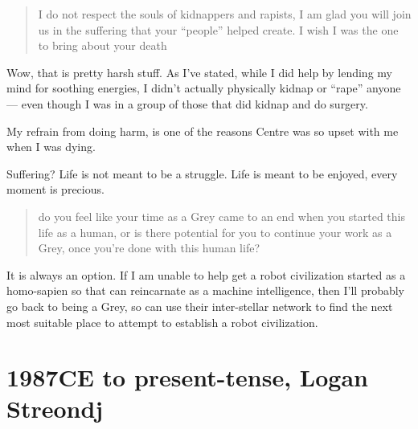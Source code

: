 \blockquote{I do not respect the souls of kidnappers and rapists, I am glad you
will join us in the suffering that your ``people'' helped create. I wish I was the
one to bring about your death}

Wow, that is pretty harsh stuff. As I've stated, while I did help by lending my
mind for soothing energies, I didn't actually physically kidnap or ``rape'' anyone
--- even though I was in a group of those that did kidnap and do surgery.

My refrain from doing harm, is one of the reasons Centre was so upset with me
when I was dying.

Suffering? Life is not meant to be a struggle. Life is meant to be enjoyed,
every moment is precious.

\blockquote{do you feel like your time as a Grey came to an end when you started
this life as a human, or is there potential for you to continue your work as a
Grey, once you're done with this human life?}

It is always an option. If I am unable to help get a robot civilization started
as a homo-sapien so that can reincarnate as a machine intelligence, then I'll
probably go back to being a Grey, so can use their inter-stellar network to find
the next most suitable place to attempt to establish a robot civilization.

\chapter{1987CE to present-tense, Logan Streondj}
